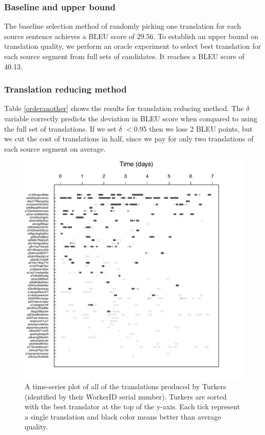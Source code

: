 \documentclass[11pt,letterpaper]{article}
\begin{document}
\subsubsection{Baseline and upper bound} 
The baseline selection method of randomly picking one translation for each source sentence achieves a BLEU score of 29.56. To establish an upper bound on translation quality, we perform an oracle experiment to select best translation for each source segment from full sets of candidates.  It reaches a BLEU score of 40.13.

\subsubsection{Translation reducing method} 

Table \ref{orderanother} shows the results for translation reducing method.  The $\delta$ variable correctly predicts the deviation in BLEU score when compared to using the full set of translations.   If we set $\delta$ $<$0.95 then we lose 2 BLEU points, but we cut the cost of translations in half, since we pay for only two translations of each source segment on average.


\begin{figure}
  \centering
  \includegraphics[width=\linewidth]{WorkerPerf/wp.pdf}
  \caption{A time-series plot of all of the translations produced by Turkers (identified by their WorkerID serial number). Turkers are sorted with the best translator at the top of the y-axis. Each tick represent a single translation and black color means better than average quality.
}
    \label{fworkerperf}
\end{figure}
\end{document}

